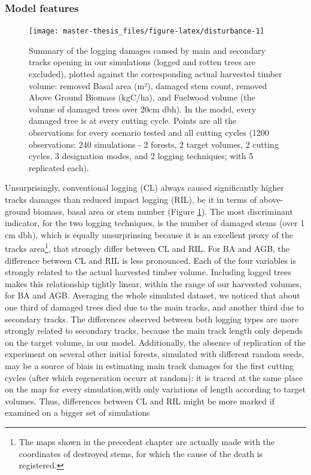 \documentclass[12pt,]{article}
\theoremstyle{definition}
\theoremstyle{definition}
\theoremstyle{definition}
\theoremstyle{remark}
\begin{document}
\subsubsection{Model features}\label{model-features}

\begin{figure}
\texttt{[image: master-thesis\_files/figure-latex/disturbance-1]} \caption{Summary of the logging damages caused by main and secondary tracks opening in our simulations (logged and rotten trees are excluded), plotted against the corresponding actual harvested timber volume: removed Basal area (m²), damaged stem count, removed Above Ground Biomass (kgC/ha), and Fuelwood volume (the volume of damaged trees over 20cm dbh). In the model, every damaged tree is at every cutting cycle. Points are all the observations for every scenario tested and all cutting cycles (1200 observations: 240 simulations - 2 forests, 2 target volumes, 2 cutting cycles, 3 designation modes, and 2 logging techniques; with 5 replicated each).}\label{fig:disturbance}
\end{figure}

Unsurprisingly, conventional logging (CL) always caused significantly
higher tracks damages than reduced impact logging (RIL), be it in terms
of above-ground biomass, basal area or stem number (Figure
\ref{fig:disturbance}). The most discriminant indicator, for the two
logging techniques, is the number of damaged stems (over 1 cm dbh),
which is equally unsurprinsing because it is an excellent proxy of the
tracks area\footnote{The maps shown in the precedent chapter are
  actually made with the coordinates of destroyed stems, for which the
  cause of the death is registered.}, that strongly differ between CL
and RIL. For BA and AGB, the difference between CL and RIL is less
pronounced. Each of the four variables is strongly related to the actual
harvested timber volume. Including logged trees makes this relationship
tightly linear, within the range of our harvested volumes, for BA and
AGB. Averaging the whole simulated dataset, we noticed that about one
third of damaged trees died due to the main tracks, and another third
due to secondary tracks. The differences observed between both logging
types are more strongly related to secondary tracks, because the main
track length only depends on the target volume, in our model.
Additionally, the absence of replication of the experiment on several
other initial forests, simulated with different random seeds, may be a
source of biais in estimating main track damages for the first cutting
cycles (after which regeneration occurr at random): it is traced at the
same place on the map for every simulation,with only variations of
length according to target volumes. Thus, differences between CL and RIL
might be more marked if examined on a bigger set of simulations
\end{document}
